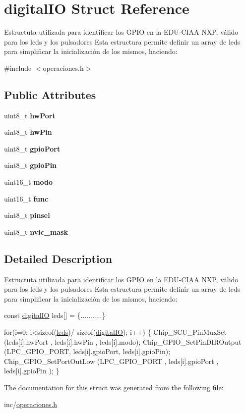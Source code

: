 \hypertarget{structdigital_i_o}{}\section{digital\+IO Struct Reference}
\label{structdigital_i_o}


Estructuta utilizada para identificar los G\+P\+IO en la E\+D\+U-\/\+C\+I\+AA N\+XP, válido para los leds y los pulsadores Esta estructura permite definir un array de leds para simplificar la inicialización de los mismos, haciendo\+:  




{\ttfamily \#include $<$operaciones.\+h$>$}

\subsection*{Public Attributes}
\begin{DoxyCompactItemize}
\item 
uint8\+\_\+t {\bfseries hw\+Port}
\item 
uint8\+\_\+t {\bfseries hw\+Pin}
\item 
uint8\+\_\+t {\bfseries gpio\+Port}
\item 
uint8\+\_\+t {\bfseries gpio\+Pin}
\item 
uint16\+\_\+t {\bfseries modo}
\item 
uint16\+\_\+t {\bfseries func}
\item 
uint8\+\_\+t {\bfseries pinsel}
\item 
uint8\+\_\+t {\bfseries nvic\+\_\+mask}
\end{DoxyCompactItemize}


\subsection{Detailed Description}
Estructuta utilizada para identificar los G\+P\+IO en la E\+D\+U-\/\+C\+I\+AA N\+XP, válido para los leds y los pulsadores Esta estructura permite definir un array de leds para simplificar la inicialización de los mismos, haciendo\+: 


\begin{DoxyCode}
 \textcolor{keyword}{const} \hyperlink{structdigital_i_o}{digitalIO} leds[] = \{...........\}

\textcolor{keywordflow}{for}(i=0; i<\textcolor{keyword}{sizeof}(\hyperlink{group__operaciones_ga9b625a8f4af05b1e2bdb0230a6440c77}{leds})/ \textcolor{keyword}{sizeof}(\hyperlink{structdigital_i_o}{digitalIO}); i++)
\{
        Chip\_SCU\_PinMuxSet (leds[i].hwPort , leds[i].hwPin , leds[i].modo);
        Chip\_GPIO\_SetPinDIROutput (LPC\_GPIO\_PORT, leds[i].gpioPort, leds[i].gpioPin);
        Chip\_GPIO\_SetPortOutLow (LPC\_GPIO\_PORT , leds[i].gpioPort , leds[i].gpioPin );
    \}
\end{DoxyCode}
 

The documentation for this struct was generated from the following file\+:\begin{DoxyCompactItemize}
\item 
inc/\hyperlink{operaciones_8h}{operaciones.\+h}\end{DoxyCompactItemize}
